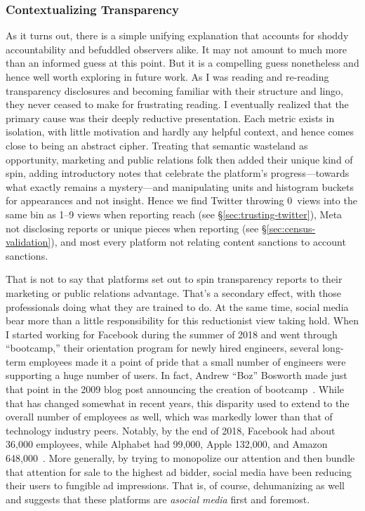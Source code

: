 \subsubsection{Contextualizing Transparency}

As it turns out, there is a simple unifying explanation that accounts for shoddy
accountability and befuddled observers alike. It may not amount to much more
than an informed guess at this point. But it is a compelling guess nonetheless
and hence well worth exploring in future work. As I was reading and re-reading
transparency disclosures and becoming familiar with their structure and lingo,
they never ceased to make for frustrating reading. I eventually realized that
the primary cause was their deeply reductive presentation. Each metric exists in
isolation, with little motivation and hardly any helpful context, and hence
comes close to being an abstract cipher. Treating that semantic wasteland as
opportunity, marketing and public relations folk then added their unique kind of
spin, adding introductory notes that celebrate the platform's progress---towards
what exactly remains a mystery---and manipulating units and histogram
buckets for appearances and not insight. Hence we find Twitter throwing 0~views
into the same bin as 1--9 views when reporting reach (see
\S\ref{sec:trusting-twitter}), Meta not disclosing  reports or unique
pieces when reporting  (see \S\ref{sec:census-validation}), and most
every platform not relating content sanctions to account sanctions.

That is not to say that platforms set out to spin transparency reports to their
marketing or public relations advantage. That's a secondary effect, with those
professionals doing what they are trained to do. At the same time, social media
bear more than a little responsibility for this reductionist view taking hold.
When I started working for Facebook during the summer of 2018 and went through
``bootcamp,'' their orientation program for newly hired engineers, several
long-term employees made it a point of pride that a small number of engineers
were supporting a huge number of users. In fact, Andrew ``Boz'' Bosworth made
just that point in the 2009 blog post announcing the creation of
bootcamp~\cite{Bosworth2009}. While that has changed somewhat in recent years,
this disparity used to extend to the overall number of employees as well, which
was markedly lower than that of technology industry peers. Notably, by the end
of 2018, Facebook had about 36,000 employees, while Alphabet had 99,000, Apple
132,000, and Amazon
648,000~\cite{MacrotrendsAlphabet,MacrotrendsAmazon,MacrotrendsApple,MacrotrendsMeta}.
More generally, by trying to monopolize our attention and then bundle that
attention for sale to the highest ad bidder, social media have been reducing
their users to fungible ad impressions. That is, of course, dehumanizing as well
and suggests that these platforms are \emph{asocial media} first and foremost.

